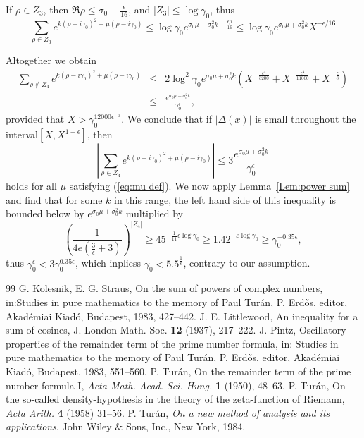\documentclass{amsart}
\begin{document}
If $\rho\in Z_3$, then $\Re\rho\leq\sigma_0-\frac{\epsilon}{16}$, and $|Z_3|\leq \log\gamma_0$, thus
\[
\sum_{\rho\in Z_3}e^{k(\rho-i\gamma_0)^2+\mu(\rho-i\gamma_0)} \leq \log\gamma_0 e^{\sigma_0\mu+\sigma_0^2 k -\frac{\epsilon\mu}{16}} \leq \log\gamma_0 e^{\sigma_0\mu+\sigma_0^2 k}X^{-\epsilon/16}
\]

Altogether we obtain
\begin{eqnarray*}
\sum_{\rho\not\in Z_4} e^{k(\rho-i\gamma_0)^2+\mu(\rho-i\gamma_0)} & \leq &  2\log^2\gamma_0 e^{\sigma_0\mu+\sigma_0^2 k}\left(X^{-\frac{\epsilon^4}{3200}} + X^{-\frac{\epsilon^4}{11000}} + X^{-\frac{\epsilon}{8}}\right)\\
 & \leq & \frac{e^{\sigma_0\mu+\sigma_0^2 k}}{\gamma_0^\epsilon},
\end{eqnarray*}
provided that $X>\gamma_0^{12000\epsilon^{-3}}$. We conclude that if $|\Delta(x)|$ is small throughout the interval$[X, X^{1+\epsilon}]$, then 
\[
\left|\sum_{\rho\in Z_4} e^{k(\rho-i\gamma_0)^2+\mu(\rho-i\gamma_0)}\right| \leq 3\frac{e^{\sigma_0\mu+\sigma_0^2k}}{\gamma_0^\epsilon}
\]
holds for all $\mu$ satisfying (\ref{eq:mu def}). We now apply Lemma~\ref{Lem:power sum} and find that for some $k$ in this range, the left hand side of this inequality is bounded below by $e^{\sigma_0\mu+\sigma_0^2k}$ multiplied by
\[
\left(\frac{1}{4e\left(\frac{3}{\epsilon}+3\right)}\right)^{|Z_4|} \geq 45^{-\frac{1}{11}\epsilon\log\gamma_0}\geq 1.42^{-\varepsilon\log\gamma_0} \geq \gamma_0^{-0.35\epsilon},
\]
thus $\gamma_0^\epsilon<3\gamma_0^{0.35\epsilon}$, which inpliess $\gamma_0<5.5^{\frac{1}{\epsilon}}$, contrary to our assumption.



\begin{thebibliography}{99}
 G. Kolesnik, E. G. Straus, On the sum of powers of complex numbers, in:Studies in pure mathematics to the memory of Paul Tur\'an, P. Erd\H os, editor, Akad\'emiai Kiad\'o, Budapest, 1983, 427--442.
 J. E. Littlewood, An inequality for a sum of cosines, {J. London Math. Soc.} {\bf 12} (1937), 217--222.
 J. Pintz, Oscillatory properties of the remainder term of the prime number formula, in: Studies in pure mathematics to the memory of Paul Tur\'an, P. Erd\H os, editor, Akad\'emiai Kiad\'o, Budapest, 1983, 551--560.
 P. Tur\'an, On the remainder term of the prime number formula I, {\em Acta Math. Acad. Sci. Hung.} {\bf 1} (1950), 48--63.
 P. Tur\'an, On the so-called density-hypothesis in the theory of the zeta-function of Riemann, {\em Acta Arith.} {\bf 4} (1958) 31--56. 
P. Tur\'an, {\em On a new method of analysis and its applications},  John Wiley \& Sons, Inc., New York, 1984.
\end{thebibliography}
\end{document}
